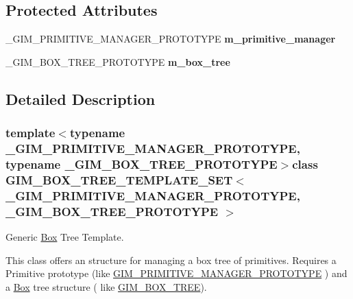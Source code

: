 \subsection*{Protected Attributes}
\begin{DoxyCompactItemize}
\item 
\hypertarget{class_g_i_m___b_o_x___t_r_e_e___t_e_m_p_l_a_t_e___s_e_t_a02c6c5d8a88dda04e4430f46a8602656}{\+\_\+\+G\+I\+M\+\_\+\+P\+R\+I\+M\+I\+T\+I\+V\+E\+\_\+\+M\+A\+N\+A\+G\+E\+R\+\_\+\+P\+R\+O\+T\+O\+T\+Y\+P\+E {\bfseries m\+\_\+primitive\+\_\+manager}}\label{class_g_i_m___b_o_x___t_r_e_e___t_e_m_p_l_a_t_e___s_e_t_a02c6c5d8a88dda04e4430f46a8602656}

\item 
\hypertarget{class_g_i_m___b_o_x___t_r_e_e___t_e_m_p_l_a_t_e___s_e_t_a8ad508edb1e059c6be39c784a8210f31}{\+\_\+\+G\+I\+M\+\_\+\+B\+O\+X\+\_\+\+T\+R\+E\+E\+\_\+\+P\+R\+O\+T\+O\+T\+Y\+P\+E {\bfseries m\+\_\+box\+\_\+tree}}\label{class_g_i_m___b_o_x___t_r_e_e___t_e_m_p_l_a_t_e___s_e_t_a8ad508edb1e059c6be39c784a8210f31}

\end{DoxyCompactItemize}


\subsection{Detailed Description}
\subsubsection*{template$<$typename \+\_\+\+G\+I\+M\+\_\+\+P\+R\+I\+M\+I\+T\+I\+V\+E\+\_\+\+M\+A\+N\+A\+G\+E\+R\+\_\+\+P\+R\+O\+T\+O\+T\+Y\+P\+E, typename \+\_\+\+G\+I\+M\+\_\+\+B\+O\+X\+\_\+\+T\+R\+E\+E\+\_\+\+P\+R\+O\+T\+O\+T\+Y\+P\+E$>$class G\+I\+M\+\_\+\+B\+O\+X\+\_\+\+T\+R\+E\+E\+\_\+\+T\+E\+M\+P\+L\+A\+T\+E\+\_\+\+S\+E\+T$<$ \+\_\+\+G\+I\+M\+\_\+\+P\+R\+I\+M\+I\+T\+I\+V\+E\+\_\+\+M\+A\+N\+A\+G\+E\+R\+\_\+\+P\+R\+O\+T\+O\+T\+Y\+P\+E, \+\_\+\+G\+I\+M\+\_\+\+B\+O\+X\+\_\+\+T\+R\+E\+E\+\_\+\+P\+R\+O\+T\+O\+T\+Y\+P\+E $>$}

Generic \hyperlink{class_box}{Box} Tree Template. 

This class offers an structure for managing a box tree of primitives. Requires a Primitive prototype (like \hyperlink{class_g_i_m___p_r_i_m_i_t_i_v_e___m_a_n_a_g_e_r___p_r_o_t_o_t_y_p_e}{G\+I\+M\+\_\+\+P\+R\+I\+M\+I\+T\+I\+V\+E\+\_\+\+M\+A\+N\+A\+G\+E\+R\+\_\+\+P\+R\+O\+T\+O\+T\+Y\+P\+E} ) and a \hyperlink{class_box}{Box} tree structure ( like \hyperlink{class_g_i_m___b_o_x___t_r_e_e}{G\+I\+M\+\_\+\+B\+O\+X\+\_\+\+T\+R\+E\+E}). 

